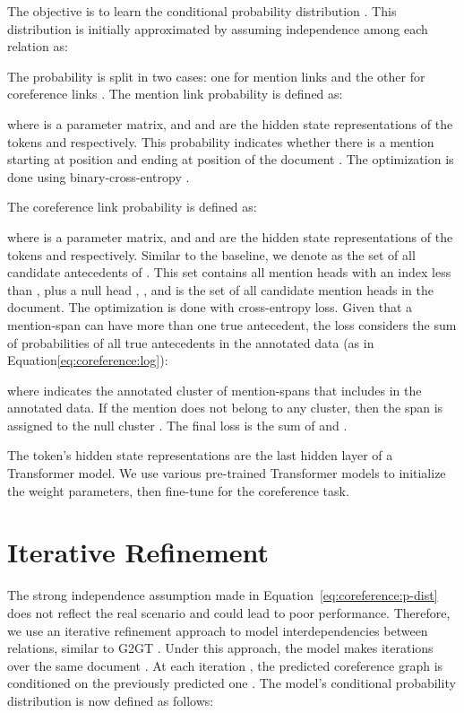 \documentclass[11pt]{article}
\begin{document}
The objective is to learn the conditional probability distribution . This distribution is initially approximated by assuming independence among each relation  as:

The probability  is split in two cases: one for mention links  and the other for coreference links . The mention link probability is defined as:

where  is a parameter matrix, and  and  are the hidden state representations of the tokens  and  respectively. This probability indicates whether there is a mention starting at position  and ending at position  of the document . The optimization is done using binary-cross-entropy .


The coreference link probability is defined as:

where  is a parameter matrix, and  and  are the hidden state representations of the tokens  and  respectively. Similar to the baseline, we denote  as the set of all candidate antecedents of . This set contains all mention heads with an index less than , plus a null head , , and  is the set of all candidate mention heads in the document. The optimization is done with cross-entropy loss. Given that a mention-span  can have more than one true antecedent, the loss considers the sum of probabilities of all true antecedents in the annotated data (as in Equation\eqref{eq:coreference:log}): 

where  indicates the annotated cluster of mention-spans that includes  in the annotated data. If the mention does not belong to any cluster, then the span is assigned to the null cluster . The final loss is the sum of  and .

The token's hidden state representations  are the last hidden layer of a Transformer model. We use various pre-trained Transformer models to initialize the weight parameters, then fine-tune for the coreference task.






\section{Iterative Refinement} 
\label{sec:coreference:ite}

The strong independence assumption made in Equation~\eqref{eq:coreference:p-dist} does not reflect the real scenario and could lead to poor performance. Therefore, we use an iterative refinement approach to model interdependencies between relations, similar to G2GT \cite{mohammadshahi2020recursive}. Under this approach, the model makes  iterations over the same document . At each iteration , the predicted coreference graph  is conditioned on the previously predicted one . The model's conditional probability distribution is now defined as follows:
\end{document}
